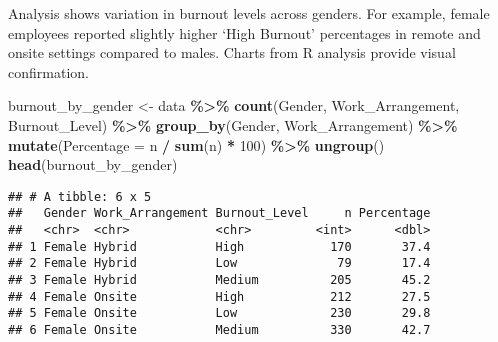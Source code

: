 \documentclass[
]{article}
\newenvironment{Shaded}{\begin{snugshade}}{\end{snugshade}}
\newcommand{\AttributeTok}[1]{\textcolor[rgb]{0.13,0.29,0.53}{#1}}
\newcommand{\DecValTok}[1]{\textcolor[rgb]{0.00,0.00,0.81}{#1}}
\newcommand{\FunctionTok}[1]{\textcolor[rgb]{0.13,0.29,0.53}{\textbf{#1}}}
\newcommand{\NormalTok}[1]{#1}
\newcommand{\OtherTok}[1]{\textcolor[rgb]{0.56,0.35,0.01}{#1}}
\newcommand{\SpecialCharTok}[1]{\textcolor[rgb]{0.81,0.36,0.00}{\textbf{#1}}}
\begin{document}
Analysis shows variation in burnout levels across genders. For example,
female employees reported slightly higher `High Burnout' percentages in
remote and onsite settings compared to males. Charts from R analysis
provide visual confirmation.

\begin{Shaded}
\begin{Highlighting}[]
\NormalTok{burnout\_by\_gender }\OtherTok{\textless{}{-}}\NormalTok{ data }\SpecialCharTok{\%\textgreater{}\%}
  \FunctionTok{count}\NormalTok{(Gender, Work\_Arrangement, Burnout\_Level) }\SpecialCharTok{\%\textgreater{}\%}
  \FunctionTok{group\_by}\NormalTok{(Gender, Work\_Arrangement) }\SpecialCharTok{\%\textgreater{}\%}
  \FunctionTok{mutate}\NormalTok{(}\AttributeTok{Percentage =}\NormalTok{ n }\SpecialCharTok{/} \FunctionTok{sum}\NormalTok{(n) }\SpecialCharTok{*} \DecValTok{100}\NormalTok{) }\SpecialCharTok{\%\textgreater{}\%}
  \FunctionTok{ungroup}\NormalTok{()}
\FunctionTok{head}\NormalTok{(burnout\_by\_gender)}
\end{Highlighting}
\end{Shaded}

\begin{verbatim}
## # A tibble: 6 x 5
##   Gender Work_Arrangement Burnout_Level     n Percentage
##   <chr>  <chr>            <chr>         <int>      <dbl>
## 1 Female Hybrid           High            170       37.4
## 2 Female Hybrid           Low              79       17.4
## 3 Female Hybrid           Medium          205       45.2
## 4 Female Onsite           High            212       27.5
## 5 Female Onsite           Low             230       29.8
## 6 Female Onsite           Medium          330       42.7
\end{verbatim}
\end{document}

